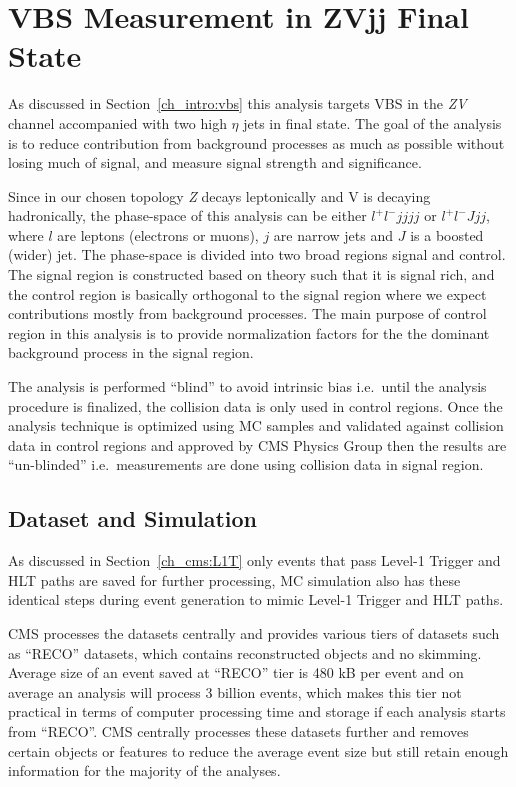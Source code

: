 \chapter{
  VBS Measurement in ZVjj Final State
 }\label{ch_vbs}

As discussed in Section~\ref{ch_intro:vbs} this analysis targets
\gls{VBS} in the \textit{ZV} channel accompanied with two high \( \eta \) jets in final state. The goal of the analysis
is to reduce contribution from background processes as much as possible
without losing much of signal, and measure signal strength and significance.

Since in our chosen topology \textit{Z} decays leptonically and V is decaying hadronically,
the phase-space of this analysis can be either
\( l^+ l^- jjjj \) or \( l^+ l^- J jj\), where \( l \) are leptons (electrons
or muons),
\( j \) are narrow jets and \( J \) is a boosted (wider) jet.
The phase-space is divided into two broad regions signal and control.
The signal region is constructed based on theory such that it is signal rich,
and the control region is basically orthogonal to the signal region
where we expect contributions mostly from background processes.
The main purpose of control region
in this analysis is to
provide normalization factors for the the dominant background
process in the signal region.

The analysis is performed ``blind'' to avoid intrinsic bias
i.e.\ until the analysis procedure is finalized, the collision data is only used
in control regions. Once the analysis technique is optimized using \gls{MC}
samples and validated against collision data in control regions and
approved by \gls{CMS} Physics Group
then the results are ``un-blinded'' i.e.\ measurements are done
using collision data in signal region.

\section{
  Dataset and Simulation
 }

As discussed in Section~\ref{ch_cms:L1T} only events that pass Level-1
Trigger and \gls{HLT} paths are saved for further processing, \gls{MC}
simulation also has these identical steps during event generation to mimic
Level-1 Trigger and \gls{HLT} paths.

\gls{CMS} processes the datasets centrally and provides various
tiers of datasets such as ``RECO'' datasets, which contains reconstructed
objects and no skimming. Average size of an event saved at ``RECO'' tier is
480 kB per event and on average an analysis will process
3 billion events, which makes this tier not practical in terms of computer processing
time and storage if each analysis starts from ``RECO''. \gls{CMS} centrally
processes these datasets further and removes certain objects
or features to reduce the average event size but still retain enough information for the
majority of the analyses.

